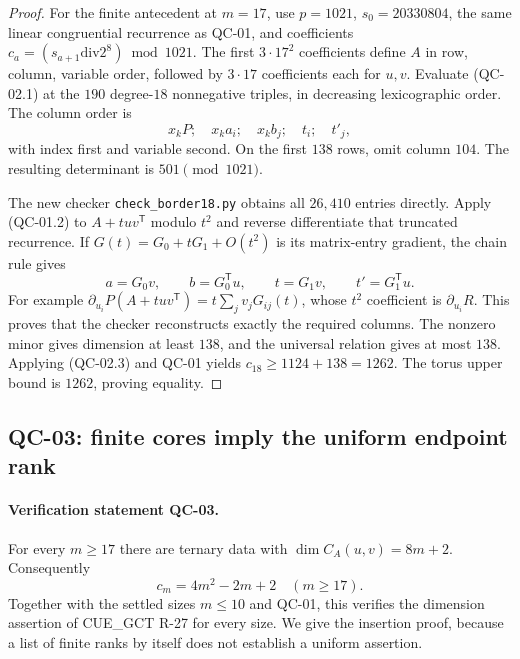 \begin{proof}
For the finite antecedent at $m=17$, use $p=1021$, $s_0=20330804$,
the same linear congruential recurrence as QC-01, and coefficients
$c_a=(s_{a+1}\mathbin{\mathrm{div}}2^8)\bmod1021$.
The first $3\cdot17^2$ coefficients define $A$ in row, column,
variable order, followed by $3\cdot17$ coefficients each for $u,v$.
Evaluate (QC-02.1) at the $190$ degree-$18$ nonnegative triples,
in decreasing lexicographic order. The column order is
\[
 x_kP;\quad x_ka_i;\quad x_kb_j;\quad t_i;\quad t'_j,
\]
with index first and variable second. On the first $138$ rows,
omit column $104$. The resulting determinant is $501\pmod{1021}$.

The new checker \texttt{check\_border18.py} obtains all $26{,}410$
entries directly. Apply (QC-01.2) to $A+tuv^{\mathsf T}$ modulo
$t^2$ and reverse differentiate that truncated recurrence. If
$G(t)=G_0+tG_1+O(t^2)$ is its matrix-entry gradient, the chain rule
gives
\[
 a=G_0v,\qquad b=G_0^{\mathsf T}u,\qquad
 t=G_1v,\qquad t'=G_1^{\mathsf T}u.
\]
For example $\partial_{u_i}P(A+tuv^{\mathsf T})=
t\sum_jv_jG_{ij}(t)$, whose $t^2$ coefficient is $\partial_{u_i}R$.
This proves that the checker reconstructs exactly the required
columns. The nonzero minor gives dimension at least $138$, and
the universal relation gives at most $138$. Applying (QC-02.3)
and QC-01 yields $c_{18}\geq1124+138=1262$. The torus upper
bound is $1262$, proving equality.
\end{proof}

\subsection{QC-03: finite cores imply the uniform endpoint rank}

\paragraph{Verification statement QC-03.}
For every $m\geq17$ there are ternary data with
$\dim C_A(u,v)=8m+2$. Consequently
\[
 c_m=4m^2-2m+2\quad(m\geq17).
 \tag{QC-03.1}
\]
Together with the settled sizes $m\leq10$ and QC-01, this verifies
the dimension assertion of CUE\_GCT R-27 for every size. We give
the insertion proof, because a list of finite ranks by itself
does not establish a uniform assertion.

